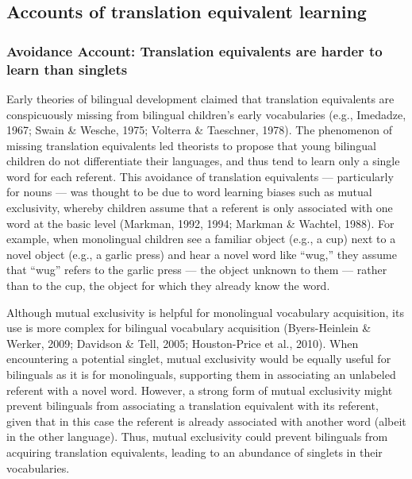 \documentclass[
  english,
  ,man,floatsintext]{apa6}
\begin{document}
\hypertarget{accounts-of-translation-equivalent-learning}{%
\subsection{Accounts of translation equivalent learning}\label{accounts-of-translation-equivalent-learning}}

\hypertarget{avoidance-account-translation-equivalents-are-harder-to-learn-than-singlets}{%
\subsubsection{Avoidance Account: Translation equivalents are harder to learn than singlets}\label{avoidance-account-translation-equivalents-are-harder-to-learn-than-singlets}}

Early theories of bilingual development claimed that translation equivalents are conspicuously missing from bilingual children's early vocabularies (e.g., Imedadze, 1967; Swain \& Wesche, 1975; Volterra \& Taeschner, 1978). The phenomenon of missing translation equivalents led theorists to propose that young bilingual children do not differentiate their languages, and thus tend to learn only a single word for each referent. This avoidance of translation equivalents --- particularly for nouns --- was thought to be due to word learning biases such as mutual exclusivity, whereby children assume that a referent is only associated with one word at the basic level (Markman, 1992, 1994; Markman \& Wachtel, 1988). For example, when monolingual children see a familiar object (e.g., a cup) next to a novel object (e.g., a garlic press) and hear a novel word like ``wug,'' they assume that ``wug'' refers to the garlic press --- the object unknown to them --- rather than to the cup, the object for which they already know the word.

Although mutual exclusivity is helpful for monolingual vocabulary acquisition, its use is more complex for bilingual vocabulary acquisition (Byers-Heinlein \& Werker, 2009; Davidson \& Tell, 2005; Houston-Price et al., 2010). When encountering a potential singlet, mutual exclusivity would be equally useful for bilinguals as it is for monolinguals, supporting them in associating an unlabeled referent with a novel word. However, a strong form of mutual exclusivity might prevent bilinguals from associating a translation equivalent with its referent, given that in this case the referent is already associated with another word (albeit in the other language). Thus, mutual exclusivity could prevent bilinguals from acquiring translation equivalents, leading to an abundance of singlets in their vocabularies.
\end{document}
